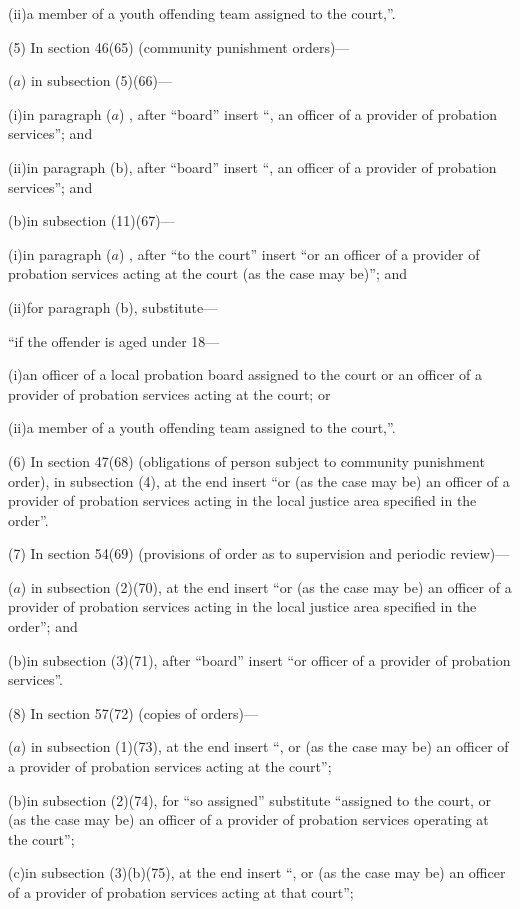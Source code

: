 \documentclass[12pt,a4paper]{article}
\begin{document}
(ii)a member of a youth offending team assigned to the court,”.

(5) In section 46(65) (community punishment orders)—

($a$) in subsection (5)(66)—

(i)in paragraph ($a$) , after “board” insert “, an officer of a provider of probation services”; and

(ii)in paragraph (b), after “board” insert “, an officer of a provider of probation services”; and

(b)in subsection (11)(67)—

(i)in paragraph ($a$) , after “to the court” insert “or an officer of a provider of probation services acting at the court (as the case may be)”; and

(ii)for paragraph (b), substitute—

“if the offender is aged under 18—

(i)an officer of a local probation board assigned to the court or an officer of a provider of probation services acting at the court; or

(ii)a member of a youth offending team assigned to the court,”.

(6) In section 47(68) (obligations of person subject to community punishment order), in subsection (4), at the end insert “or (as the case may be) an officer of a provider of probation services acting in the local justice area specified in the order”.

(7) In section 54(69) (provisions of order as to supervision and periodic review)—

($a$) in subsection (2)(70), at the end insert “or (as the case may be) an officer of a provider of probation services acting in the local justice area specified in the order”; and

(b)in subsection (3)(71), after “board” insert “or officer of a provider of probation services”.

(8) In section 57(72) (copies of orders)—

($a$) in subsection (1)(73), at the end insert “, or (as the case may be) an officer of a provider of probation services acting at the court”;

(b)in subsection (2)(74), for “so assigned” substitute “assigned to the court, or (as the case may be) an officer of a provider of probation services operating at the court”;

(c)in subsection (3)(b)(75), at the end insert “, or (as the case may be) an officer of a provider of probation services acting at that court”;
\end{document}
